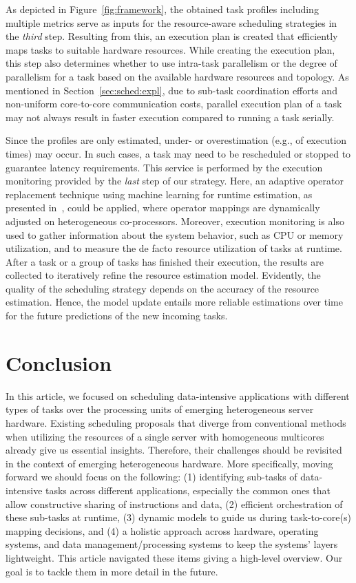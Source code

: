 \documentclass[11pt,dvipdfm]{article}
\newcommand{\reffig}[1]{Figure~\ref{fig:#1}}
\newcommand{\refsec}[1]{Section~\ref{sec:#1}}
\begin{document}
As depicted in \reffig{framework},
the obtained task profiles including multiple metrics serve as inputs for the resource-aware scheduling strategies
in the \textit{third} step.
Resulting from this, an execution plan is created that efficiently maps tasks to suitable hardware resources.
While creating the execution plan, this step also determines whether to use intra-task parallelism or
the degree of parallelism for a task based on the available hardware resources and topology.
As mentioned in \refsec{sched:expl}, due to sub-task coordination efforts and non-uniform core-to-core communication costs,
parallel execution plan of a task may not always result in faster execution compared to running a task serially.

Since the profiles are only estimated, under- or overestimation (e.g., of execution times) may occur.
In such cases, a task may need to be rescheduled or stopped to guarantee latency requirements.
This service is performed by the execution monitoring provided by the \textit{last} step of our strategy.
Here, an adaptive operator replacement technique using machine learning for runtime estimation,
as presented in~\cite{Bress_2014},
could be applied, where operator mappings are dynamically adjusted on heterogeneous co-processors.
Moreover, execution monitoring is also used to gather information about the system behavior, such as CPU or memory utilization, and to measure the de facto resource utilization of tasks at runtime. After a task or a group of tasks has finished their execution, the results are collected to iteratively refine the resource estimation model. Evidently, the quality of the scheduling strategy depends on the accuracy of the resource estimation. Hence, the model update entails more reliable estimations over time for the future predictions of the new incoming tasks.

\section{Conclusion}
\label{sec:conc}

In this article,
we focused on scheduling data-intensive applications with different types of tasks
over the processing units of emerging heterogeneous server hardware.
Existing scheduling proposals that diverge from conventional methods when utilizing the resources
of a single server with homogeneous multicores already give us essential insights.
Therefore, their challenges should be revisited in the context of emerging heterogeneous hardware.
More specifically, moving forward we should focus on the following:
(1) identifying sub-tasks of data-intensive tasks across different applications,
especially the common ones that allow constructive sharing of instructions and data,
(2) efficient orchestration of these sub-tasks at runtime,
(3) dynamic models to guide us during task-to-core(s) mapping decisions, and
(4) a holistic approach across hardware, operating systems, and data management/processing systems
to keep the systems' layers lightweight.
This article navigated these items giving a high-level overview.
Our goal is to tackle them in more detail in the future.
\end{document}

